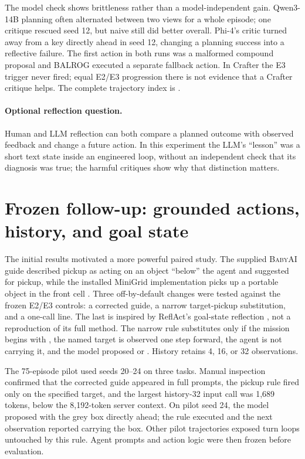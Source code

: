 \documentclass[11pt,a4paper]{article}
\newcommand{\BabyAI}{\textsc{BabyAI}}
\begin{document}
The model check shows brittleness rather than a model-independent gain. Qwen3-14B planning often alternated between two views for a whole episode; one critique rescued  seed 12, but naive still did better overall. Phi-4's critic turned away from a key directly ahead in  seed 12, changing a planning success into a reflective failure. The first action in both runs was a malformed compound proposal and BALROG executed a separate fallback action. In Crafter the E3 trigger never fired; equal E2/E3 progression there is not evidence that a Crafter critique helps. The complete trajectory index is .

\paragraph{Optional reflection question.} Human and LLM reflection can both compare a planned outcome with observed feedback and change a future action. In this experiment the LLM's ``lesson'' was a short text state inside an engineered loop, without an independent check that its diagnosis was true; the harmful critiques show why that distinction matters.

\section{Frozen follow-up: grounded actions, history, and goal state}

The initial results motivated a more powerful paired study. The supplied \BabyAI{} guide described pickup as acting on an object ``below'' the agent and suggested  for pickup, while the installed MiniGrid implementation picks up a portable object in the front cell \cite{minigrid}. Three off-by-default changes were tested against the frozen E2/E3 controls: a corrected guide, a narrow target-pickup substitution, and a one-call  line. The last is inspired by ReflAct's goal-state reflection \cite{reflact}, not a reproduction of its full method. The narrow rule substitutes  only if the mission begins with , the named target is observed one step forward, the agent is not carrying it, and the model proposed  or . History retains 4, 16, or 32 observations.

The 75-episode pilot used seeds 20--24 on three tasks. Manual inspection confirmed that the corrected guide appeared in full prompts, the pickup rule fired only on the specified target, and the largest history-32 input call was 1,689 tokens, below the 8,192-token server context. On pilot  seed 24, the model proposed  with the grey box directly ahead; the rule executed  and the next observation reported carrying the box. Other pilot trajectories exposed turn loops untouched by this rule. Agent prompts and action logic were then frozen before evaluation.
\end{document}
